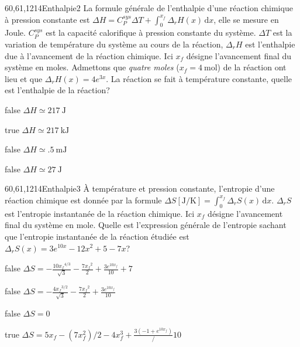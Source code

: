 \documentclass[11pt]{article}
\begin{document}
		\begin{question}{60,61,1214}{Enthalpie}{2}{}
			La formule générale de l'enthalpie d'une réaction chimique à pression constante est $\displaystyle \Delta H = C_P^{sys} \Delta T + \int^{x_f}_{0}\Delta_r H(x)\, \mathrm{d}x$, elle se mesure en Joule. $C_P^{sys}$ est la capacité calorifique à pression constante du système. $\Delta T$ est la variation de température du système au cours de la réaction, $\Delta_r H$ est l'enthalpie due à l'avancement de la réaction chimique. Ici $x_f$ désigne l'avancement final du système en moles. Admettons que \emph{quatre moles} ($x_f = \SI{4}{\mole}$) de la réaction  ont lieu et que $\Delta_rH(x) = 4e^{3x}$. La réaction se fait à température constante, quelle est l'enthalpie de la réaction?
		\end{question}
		\begin{reponses}
			\item[false] $\Delta H \simeq \SI{217}{\joule}$
			\item[true] $\Delta H \simeq \SI{217}{\kilo\joule}$
			\item[false] $\Delta H \simeq \SI{.5}{\milli\joule}$
			\item[false] $\Delta H \simeq \SI{27}{\joule}$
		\end{reponses}
		
		\begin{question}{60,61,1214}{Enthalpie}{3}{}
			À température et pression constante, l'entropie d'une réaction chimique est donnée par la formule $\displaystyle \Delta S[\si{\joule\per\kelvin}] = \int^{x_f}_{0}\Delta_r S(x)\, \mathrm{d}x$. $\Delta_r S$ est l'entropie instantanée de la réaction chimique. Ici $x_f$ désigne l'avancement final du système en mole. Quelle est l'expression générale de l'entropie sachant que l'entropie instantanée de la réaction étudiée est $\Delta_r S(x) = 3e^{10x}-12x^2+5-7x$?
		\end{question}
		\begin{reponses}
			\item[false] $\displaystyle\Delta S = -\frac{10 {x_f}^{4/3}}{\sqrt{3}}-\frac{7 {x_f}^2}{2}+\frac{3 e^{10 {x_f}}}{10}+7$
			\item[false] $\displaystyle\Delta S = -\frac{4 {x_f}^{3/2}}{\sqrt{3}}-\frac{7 {x_f}^2}{2}+\frac{3 e^{10 {x_f}}}{10}$
			\item[false] $\displaystyle\Delta S = 0$
			\item[true] $\displaystyle\Delta S = 5 x_f - (7 x_f^2)/2 - 4 x_f^3 + \frac{3 (-1 + e^{10 {x_f}})}/{10}$
		\end{reponses}
    
\end{document}

